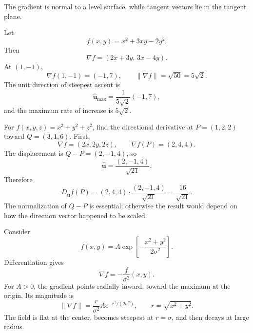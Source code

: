 \begin{bookfigure}{The gradient is normal to a level surface, while tangent vectors lie in the tangent plane.}
\label{fig:gradient-level-surface}
\end{bookfigure}


\begin{bookexample}
Let
\[
f(x,y)=x^2+3xy-2y^2.
\]
Then
\[
\nabla f=(2x+3y,\,3x-4y).
\]
At $(1,-1)$,
\[
\nabla f(1,-1)=(-1,7),
\qquad
\lVert\nabla f\rVert=\sqrt{50}=5\sqrt2.
\]
The unit direction of steepest ascent is
\[
\hat{\mathbf u}_{\max}=\frac{1}{5\sqrt2}(-1,7),
\]
and the maximum rate of increase is $5\sqrt2$.
\end{bookexample}

\begin{bookexample}
For $f(x,y,z)=x^2+y^2+z^2$, find the directional derivative at $P=(1,2,2)$ toward $Q=(3,1,6)$. First,
\[
\nabla f=(2x,2y,2z),
\qquad
\nabla f(P)=(2,4,4).
\]
The displacement is $Q-P=(2,-1,4)$, so
\[
\hat{\mathbf u}=\frac{(2,-1,4)}{\sqrt{21}}.
\]
Therefore
\[
D_{\hat{\mathbf u}}f(P)
=(2,4,4)\cdot\frac{(2,-1,4)}{\sqrt{21}}
=\frac{16}{\sqrt{21}}.
\]
The normalization of $Q-P$ is essential; otherwise the result would depend on how the direction vector happened to be scaled.
\end{bookexample}

\begin{bookexample}
Consider
\[
f(x,y)=A\exp\!\left[-\frac{x^2+y^2}{2\sigma^2}\right].
\]
Differentiation gives
\[
\nabla f
=-\frac{f}{\sigma^2}(x,y).
\]
For $A>0$, the gradient points radially inward, toward the maximum at the origin. Its magnitude is
\[
\lVert\nabla f\rVert
=\frac{r}{\sigma^2}A e^{-r^2/(2\sigma^2)},
\qquad r=\sqrt{x^2+y^2}.
\]
The field is flat at the center, becomes steepest at $r=\sigma$, and then decays at large radius.
\end{bookexample}

